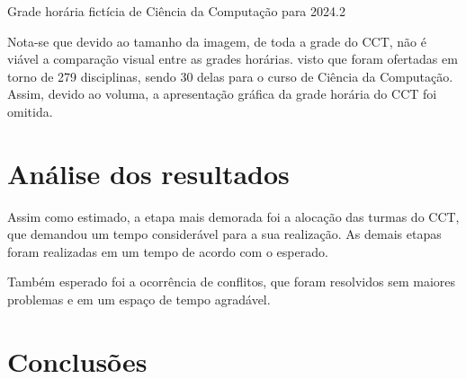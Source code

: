 \begin{MyCenteredFigure}
  \caption{Grade horária fictícia de Ciência da Computação para 2024.2}
  \label{fig:grade-horaria-cc-2024.2}
\end{MyCenteredFigure}

Nota-se que devido ao tamanho da imagem, de toda a grade do CCT, não é viável a comparação visual entre as grades horárias. visto que foram ofertadas em torno de 279 disciplinas, sendo 30 delas para o curso de Ciência da Computação. Assim, devido ao voluma, a apresentação gráfica da grade horária do CCT foi omitida.

\section{Análise dos resultados}

Assim como estimado, a etapa mais demorada foi a alocação das turmas do CCT, que demandou um tempo considerável para a sua realização. As demais etapas foram realizadas em um tempo de acordo com o esperado.

Também esperado foi a ocorrência de conflitos, que foram resolvidos sem maiores problemas e em um espaço de tempo agradável.

\section{Conclusões}
